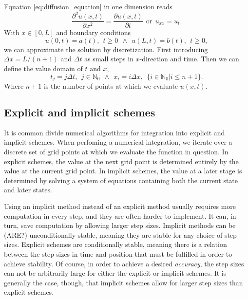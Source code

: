 \documentclass[reprint, english,notitlepage,nofootinbib]{revtex4-1}  %
\begin{document}
Equation \eqref{eq:diffusion_equation} in one dimension reads
\begin{equation}
\label{eq:diffusion_equation_1D}
\frac{\partial^2u(x, t)}{\partial x^2} = \frac{\partial u(x,t)}{\partial t} \ \ \text{or} \ \ u_{xx} = u_t.
\end{equation}
With $x\in[0,L]$ and boundary conditions
\begin{equation*}
\label{eq:boundary_conditions}
u(0, t) = a(t), \ \ t\geq 0 \ \ \wedge \ \ u(L,t) = b(t), \ \ t\geq 0,
\end{equation*}
we can approximate the solution by discretization. First introducing $\Delta x = L/(n+1)$ and $\Delta t$ as small steps in $x$-direction and time. Then we can define the value domain of $t$ and $x$,
\begin{equation*}
t_j = j\Delta t, \ \ j\in \mathbb{N}_0 \ \ \wedge \ \ x_i = i\Delta x, \ \ \{i \in \mathbb{N}_0 | i \leq n + 1\}.
\end{equation*}
Where $n + 1$ is the number of points at which we evaluate $u(x,t)$.


\subsection*{Explicit and implicit schemes}

It is common divide numerical algorithms for integration into explicit and implicit schemes. When perfoming a numerical integration, we iterate over a discrete set of grid points at which we evaluate the function in question. In explicit schemes, the value at the next grid point is determined entirely by the value at the current grid point. In implicit schemes, the value at a later stage is determined by solving a system of equations containing both the current state and later states.

Using an implicit method instead of an explicit method usually requires more computation in every step, and they are often harder to implement. It can, in turn, save computation by allowing larger step sizes. Implicit methods can be (ARE?) unconditionally stable, meaning they are stable for any choice of step sizes. Explicit schemes are conditionally stable, meaning there is a relation between the step sizes in time and position that must be fulfilled in order to achieve stability. Of course, in order to achieve a desired  \textit{accuracy}, the step sizes can not be arbitrarily large for either the explicit or implicit schemes. It is generally the case, though, that implicit schemes allow for larger step sizes than explicit schemes.
\end{document}
